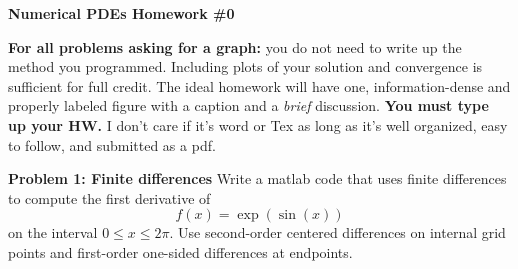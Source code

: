 \documentclass[12pt]{article}
\begin{document}
\begin{center}
\textbf{Numerical PDEs Homework \#0}\\
\end{center}

\noindent \textbf{For all problems asking for a graph:} you do not need to write up the method you programmed. Including plots of your solution and convergence is sufficient for full credit. The ideal homework will have one, information-dense and properly labeled figure with a caption and a \textit{brief} discussion. \textbf{You must type up your HW.} I don't care if it's word or Tex as long as it's well organized, easy to follow, and submitted as a pdf.

\vspace{0.3cm}

\noindent \textbf{Problem 1: Finite differences}
Write a matlab code that uses finite differences to compute the first derivative of
$$f(x) = \exp(\sin(x))$$
on the interval $0 \leq x \leq 2\pi$. Use second-order centered differences on internal grid points and first-order one-sided differences at endpoints.
\end{document}
